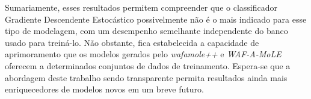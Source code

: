 Sumariamente, esses resultados permitem compreender que o classificador Gradiente Descendente Estocástico possivelmente não é o mais indicado para esse tipo de modelagem, com um desempenho semelhante independente do banco usado para treiná-lo. Não obstante, fica estabelecida a capacidade de aprimoramento que os modelos gerados pelo \textit{wafamole++} e \textit{WAF-A-MoLE} oferecem a determinados conjuntos de dados de treinamento. Espera-se que a abordagem deste trabalho sendo transparente permita resultados ainda mais enriquecedores de modelos novos em um breve futuro.

